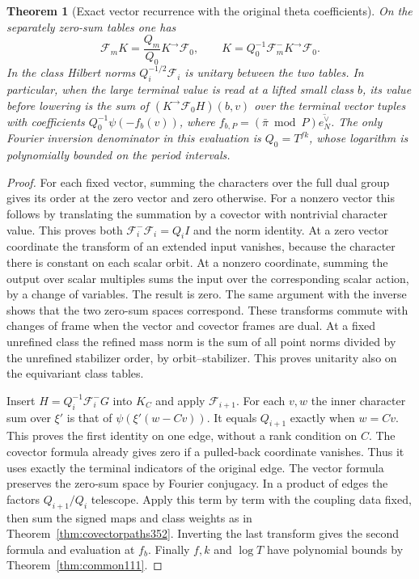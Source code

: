 \documentclass[a4paper,11pt]{article}
\newtheorem{theorem}[proposition]{Theorem}
\theoremstyle{definition}
\theoremstyle{remark}
\numberwithin{equation}{section}
\begin{document}
\begin{theorem}[Exact vector recurrence with the original theta coefficients]\leavevmode
\label{thm:vectorchain353}
On the separately zero-sum tables one has
\[
 \mathcal F_m K=\frac{Q_m}{Q_0}K^\to\mathcal F_0,\qquad
 K=Q_0^{-1}\mathcal F_m^- K^\to\mathcal F_0 .
\]
In the class Hilbert norms \(Q_i^{-1/2}\mathcal F_i\) is unitary
between the two tables. In particular, when the large terminal
value is read at a lifted small class \(b\), its value before
lowering is the sum of \((K^\to\mathcal F_0 H)(b,v)\) over the
terminal vector tuples with coefficients
\(Q_0^{-1}\psi(-f_b(v))\), where
\(f_{b,P}=(\bar\pi\bmod P)\overline{e_N^\vee}\).
The only Fourier inversion denominator in this evaluation is
\(Q_0=T^{fk}\), whose logarithm is polynomially bounded on the
period intervals.
\end{theorem}
\begin{proof}
For each fixed vector, summing the characters over the full
dual group gives its order at the zero vector and zero otherwise.
For a nonzero vector this follows by translating the summation
by a covector with nontrivial character value. This proves both
\(\mathcal F_i^-\mathcal F_i=Q_i I\) and the norm identity.
At a zero vector coordinate the transform of an extended input
vanishes, because the character there is constant on each scalar
orbit. At a nonzero coordinate, summing the output over scalar
multiples sums the input over the corresponding scalar action,
by a change of variables. The result is zero. The same argument
with the inverse shows that the two zero-sum spaces correspond.
These transforms commute with changes of frame when the vector
and covector frames are dual. At a fixed unrefined class the
refined mass norm is the sum of all point norms divided by the
unrefined stabilizer order, by orbit--stabilizer. This proves
unitarity also on the equivariant class tables.

Insert \(H=Q_i^{-1}\mathcal F_i^-G\) into \(K_C\) and apply
\(\mathcal F_{i+1}\). For each \(v,w\) the inner character sum
over \(\xi'\) is that of \(\psi(\xi'(w-Cv))\). It equals
\(Q_{i+1}\) exactly when \(w=Cv\). This proves the first
identity on one edge, without a rank condition on \(C\).
The covector formula already gives zero if a pulled-back
coordinate vanishes. Thus it uses exactly the terminal indicators
of the original edge. The vector formula preserves the zero-sum
space by Fourier conjugacy. In a product of edges the factors
\(Q_{i+1}/Q_i\) telescope. Apply this term by term with the
coupling data fixed, then sum the signed maps and class weights
as in Theorem~\ref{thm:covectorpaths352}. Inverting the last
transform gives the second formula and evaluation at \(f_b\).
Finally \(f,k\) and \(\log T\) have polynomial bounds by
Theorem~\ref{thm:common111}.
\end{proof}
\end{document}
